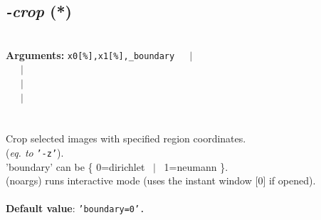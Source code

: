 \documentclass[a4paper,11pt,twoside]{book}
\begin{document}
\subsection{\emph{-crop} (*)}\vspace*{-0.5em}
~\\\textbf{Arguments: } 
{\small \texttt{x0[\%],x1[\%],\_boundary}}~~~$|$\\
~~~$|$\\
~~~$|$\\
~~~$|$\\
\\~\\
Crop selected images with specified region coordinates.
~\\(\emph{eq. to} {\small \texttt{'-z'}}).
~\\'boundary' can be \{ 0=dirichlet ~$|$~ 1=neumann \}.
~\\(noargs) runs interactive mode (uses the instant window [0] if opened).
~\\~\\\textbf{Default value}: {\small \texttt{'boundary=0'.}}
\end{document}
